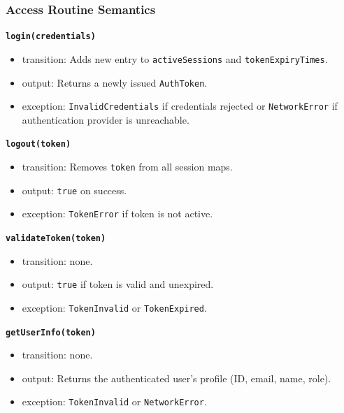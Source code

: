\documentclass[12pt, titlepage]{article}
\begin{document}
\subsubsection{Access Routine Semantics}

\noindent\textbf{\texttt{login(credentials)}}
\begin{itemize}
\item transition: Adds new entry to \texttt{activeSessions} and \texttt{tokenExpiryTimes}.
\item output: Returns a newly issued \texttt{AuthToken}.
\item exception: \texttt{InvalidCredentials} if credentials rejected or \texttt{NetworkError} if authentication provider is unreachable.
\end{itemize}

\vspace{0.2cm}

\noindent\textbf{\texttt{logout(token)}}
\begin{itemize}
\item transition: Removes \texttt{token} from all session maps.
\item output: \texttt{true} on success.
\item exception: \texttt{TokenError} if token is not active.
\end{itemize}

\vspace{0.2cm}

\noindent\textbf{\texttt{validateToken(token)}}
\begin{itemize}
\item transition: none.
\item output: \texttt{true} if token is valid and unexpired.
\item exception: \texttt{TokenInvalid} or \texttt{TokenExpired}.
\end{itemize}

\vspace{0.2cm}

\noindent\textbf{\texttt{getUserInfo(token)}}
\begin{itemize}
\item transition: none.
\item output: Returns the authenticated user's profile (ID, email, name, role).
\item exception: \texttt{TokenInvalid} or \texttt{NetworkError}.
\end{itemize}

\vspace{0.2cm}
\end{document}
